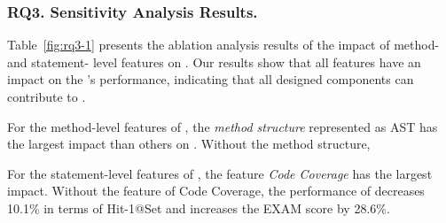 \subsubsection{\bf RQ3. Sensitivity Analysis Results.}

Table~\ref{fig:rq3-1} presents the ablation analysis results of the impact of method- and statement- level features on {\tool}. Our results show that all features have an impact on the {\tool}'s performance, indicating that all designed components can contribute to {\tool}. 

For the method-level features of {\tool}, the {\it method structure} represented as AST has the largest impact than others on {\tool}. Without the method structure, 





For the statement-level features of {\tool}, the feature {\it Code Coverage} has the largest impact. Without the feature of Code Coverage, the performance of {\tool} decreases 10.1\% in terms of Hit-1@Set and increases the EXAM score by 28.6\%.


